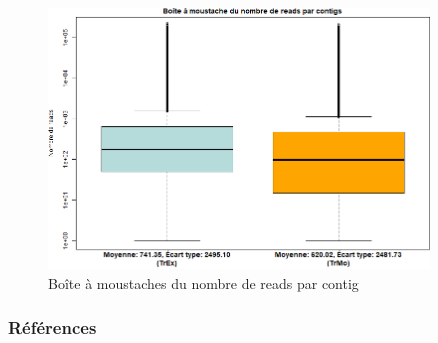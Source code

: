 \begin{frame}{}
   \begin{figure}[ht]
      \centering
       \includegraphics[width=0.9\textwidth]{./Illustrations/boxplotTr.png}
       \caption{Boîte à moustaches du nombre de reads par contig}
       \label{fig:BoxPlotContigs}
   \end{figure}

\end{frame}




\begin{frame}[allowframebreaks]
   \frametitle{Références}
   \printbibliography
\end{frame}





